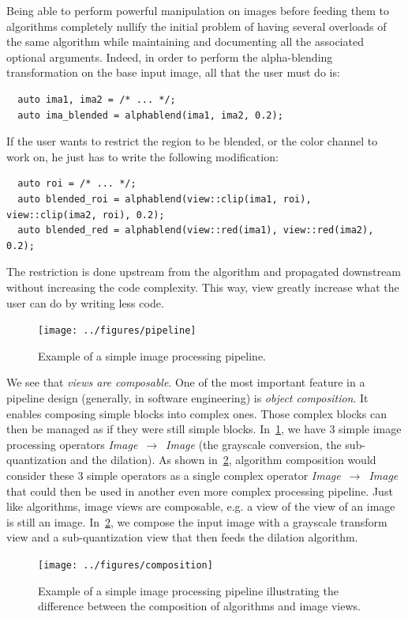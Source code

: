 Being able to perform powerful manipulation on images before feeding them to algorithms completely nullify the initial
problem of having several overloads of the same algorithm while maintaining and documenting all the associated optional
arguments. Indeed, in order to perform the alpha-blending transformation on the base input image, all that the user must
do is:
\begin{verbatim}
  auto ima1, ima2 = /* ... */;
  auto ima_blended = alphablend(ima1, ima2, 0.2);
\end{verbatim}
If the user wants to restrict the region to be blended, or the color channel to work on, he just has to write the
following modification:
\begin{verbatim}
  auto roi = /* ... */;
  auto blended_roi = alphablend(view::clip(ima1, roi), view::clip(ima2, roi), 0.2);
  auto blended_red = alphablend(view::red(ima1), view::red(ima2), 0.2);
\end{verbatim}
The restriction is done upstream from the algorithm and propagated downstream without increasing the code complexity.
This way, view greatly increase what the user can do by writing less code.

\begin{figure}[htbp]
  \centering
  \texttt{[image: ../figures/pipeline]}
  \caption[]{Example of a simple image processing pipeline.}
  \label{summary:fig:view.pipeline}
\end{figure}

We see that \emph{views are composable}. One of the most important feature in a pipeline design (generally, in software
engineering) is \emph{object composition}. It enables composing simple blocks into complex ones. Those complex blocks
can then be managed as if they were still simple blocks. In~\cref{summary:fig:view.pipeline}, we have 3 simple image
processing operators \emph{Image}~\(\rightarrow\)~\emph{Image} (the grayscale conversion, the sub-quantization and the
dilation). As shown in~\cref{summary:fig:view.comp}, algorithm composition would consider these 3 simple operators as a
single complex operator \emph{Image}~\(\rightarrow\)~\emph{Image} that could then be used in another even more complex
processing pipeline. Just like algorithms, image views are composable, e.g. a view of the view of an image is still an
image. In~\cref{summary:fig:view.comp}, we compose the input image with a grayscale transform view and a
sub-quantization view that then feeds the dilation algorithm.

\begin{figure}[htbp]
  \centering
  \texttt{[image: ../figures/composition]}
  \caption[]{Example of a simple image processing pipeline illustrating the difference between the composition of
    algorithms and image views.}
  \label{summary:fig:view.comp}
\end{figure}

